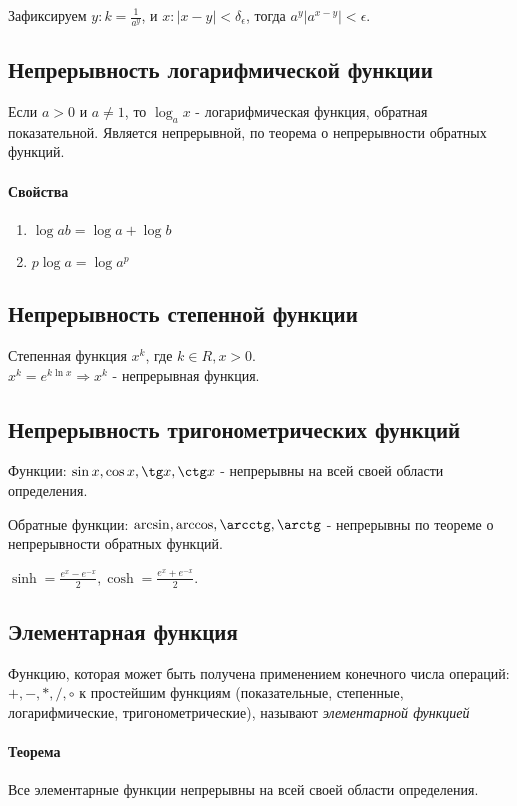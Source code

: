 \documentclass[10pt]{article}
\begin{document}
			Зафиксируем $y : k = \frac{1}{a^y}$, и $x : |x - y| < \delta_\epsilon$, тогда $a^y|a^{x-y}| < \epsilon$.
		\subsection{Непрерывность логарифмической функции}
			Если $a > 0$ и $a \neq 1$, то $\log_a x$ - логарифмическая функция, обратная показательной. Является непрерывной, по теорема о непрерывности обратных функций.
			
			\paragraph{Свойства}
			\begin{enumerate}
				\item $\log ab = \log a + \log b$
				\item $p\log a = \log a^p$
			\end{enumerate}
		\subsection{Непрерывность степенной функции}
			Степенная функция $x^k$, где $k \in R, x > 0$. \\
			$x^k = e^{k\ln x} \Rightarrow x^k$ - непрерывная функция.
		\subsection{Непрерывность тригонометрических функций}
			Функции: $\sin x, \cos x, \tg x, \ctg x$ - непрерывны на всей своей области определения. %
			
			Обратные функции: $\arcsin, \arccos, \arcctg, \arctg$ - непрерывны по теореме о непрерывности обратных функций.
			
			$\sinh = \frac{e^x - e^{-x}}{2}, \cosh =  \frac{e^x + e^{-x}}{2}$.
			
		\subsection{Элементарная функция}
		Функцию, которая может быть получена применением конечного числа операций: $+,-,*,/,\circ$ к простейшим функциям (показательные, степенные, логарифмические, тригонометрические), называют \textit{элементарной функцией}
		
		\paragraph{Теорема}
		Все элементарные функции непрерывны на всей своей области определения.
		
\end{document}

